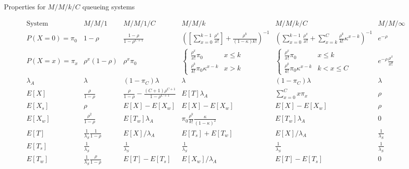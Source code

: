 \documentclass{article}
\newcommand{\utilization}{\rho}
\begin{document}
{\renewcommand{\arraystretch}{1.5}
\begin{sidewaystable}
\caption{Properties for $M/M/k/C$ queueing systems}
\label{tab:properties}
\[ \begin{array}{c|ccccc}
\mbox{System} & M/M/1 & M/M/1/C & M/M/k & M/M/k/C & M/M/\infty \\
\hline
P(X=0)=\pi_0 & 1-\utilization & \frac{1-\utilization}{1-\utilization^{C+1}} & 
\left(\left[\sum_{x=0}^{k-1} \frac{\utilization^x}{x!}\right] + \frac{\utilization^k}{(1-\kappa)k!}\right)^{-1} &
\left(\sum_{x=0}^{k-1} \frac{\utilization^x}{x!} + \sum_{x=k}^C \frac{\utilization^k}{k!}\kappa^{x-k} \right)^{-1} 
& e^{-\utilization} \\
P(X=x)=\pi_x & \utilization^x (1-\utilization) & \utilization^x \pi_0 & \left\{ \begin{array}{ll} \frac{\utilization^x}{x!}\pi_0 & x\le k \\ \frac{\utilization^k}{k!}\pi_0 \kappa^{x-k} & x>k \end{array} \right. 
& \left\{ \begin{array}{ll} \frac{\utilization^x}{x!}\pi_0 & x\le k \\ \frac{\utilization^k}{k!} \pi_0\kappa ^{x-k} & k<x\le C \end{array} \right.   & e^{-\utilization} \frac{\utilization^x}{x!} \\
\hline
\lambda_A & \lambda & (1-\pi_C)\lambda & \lambda & (1-\pi_C)\lambda & \lambda \\
\hline
E[X] & \frac{\utilization}{1-\utilization} & \frac{\utilization}{1-\utilization} - \frac{(C+1)\utilization^{C+1}}{1-\utilization^{C+1}} & E[T]\lambda_A & \sum_{x=0}^C x \pi_x & \utilization \\
E[X_s] & \utilization & E[X]-E[X_w] & E[X]-E[X_w] & E[X]-E[X_w] & \utilization \\
E[X_w] & \frac{\utilization^2}{1-\utilization} & E[T_w] \lambda_A & \pi_0 \frac{\utilization^k}{k!} \frac{\kappa}{(1-\kappa)^2} & E[T_w] \lambda_A& 0 \\
E[T] & \frac{1}{\lambda_S}\frac{1}{1-\utilization} & E[X]/\lambda_A & E[T_s]+E[T_w] & E[X]/\lambda_A & \frac{1}{\lambda_S} \\
E[T_s] & \frac{1}{\lambda_S} & \frac{1}{\lambda_S} & \frac{1}{\lambda_S} & \frac{1}{\lambda_S} & \frac{1}{\lambda_S} \\
E[T_w] & \frac{1}{\lambda_S}\frac{\utilization}{1-\utilization} & E[T]-E[T_s] & E[X_w] / \lambda_A  & E[T]-E[T_s]& 0 \\
\end{array} \]
\end{sidewaystable}
}
\end{document}
